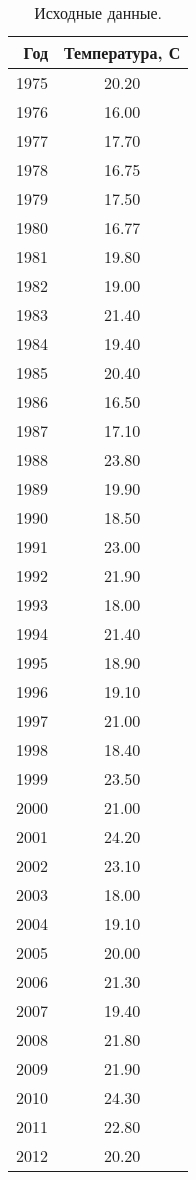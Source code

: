 \begin{table}[H]
\centering
\caption{Исходные данные.} 
\label{table:source}
\begin{tabular}{|rc|}
  \hline
Год & Температура, С \\ 
  \hline
1975 & 20.20 \\ 
  1976 & 16.00 \\ 
  1977 & 17.70 \\ 
  1978 & 16.75 \\ 
  1979 & 17.50 \\ 
  1980 & 16.77 \\ 
  1981 & 19.80 \\ 
  1982 & 19.00 \\ 
  1983 & 21.40 \\ 
  1984 & 19.40 \\ 
  1985 & 20.40 \\ 
  1986 & 16.50 \\ 
  1987 & 17.10 \\ 
  1988 & 23.80 \\ 
  1989 & 19.90 \\ 
  1990 & 18.50 \\ 
  1991 & 23.00 \\ 
  1992 & 21.90 \\ 
  1993 & 18.00 \\ 
  1994 & 21.40 \\ 
  1995 & 18.90 \\ 
  1996 & 19.10 \\ 
  1997 & 21.00 \\ 
  1998 & 18.40 \\ 
  1999 & 23.50 \\ 
  2000 & 21.00 \\ 
  2001 & 24.20 \\ 
  2002 & 23.10 \\ 
  2003 & 18.00 \\ 
  2004 & 19.10 \\ 
  2005 & 20.00 \\ 
  2006 & 21.30 \\ 
  2007 & 19.40 \\ 
  2008 & 21.80 \\ 
  2009 & 21.90 \\ 
  2010 & 24.30 \\ 
  2011 & 22.80 \\ 
  2012 & 20.20 \\ 
   \hline
\end{tabular}
\end{table}
